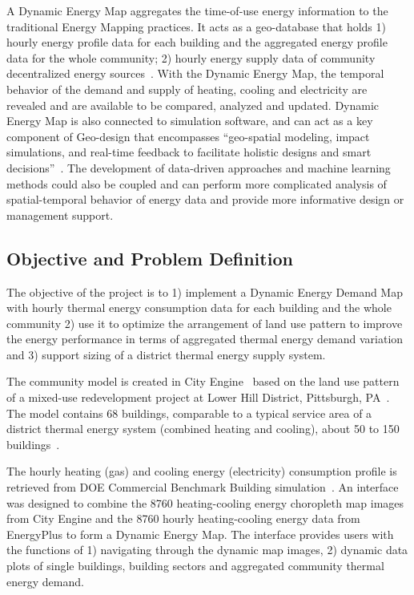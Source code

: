 \documentclass[hidelinks,12pt]{article}
\begin{document}
A Dynamic Energy Map aggregates the time-of-use energy information to
the traditional Energy Mapping practices. It acts as a geo-database
that holds 1) hourly energy profile data for each building and the
aggregated energy profile data for the whole community; 2) hourly
energy supply data of community decentralized energy
sources~\cite{baird2014}. With the Dynamic Energy Map, the temporal
behavior of the demand and supply of heating, cooling and electricity
are revealed and are available to be compared, analyzed and
updated. Dynamic Energy Map is also connected to simulation software,
and can act as a key component of Geo-design that encompasses
``geo-spatial modeling, impact simulations, and real-time feedback to
facilitate holistic designs and smart
decisions''~\cite{esriGeodesign2012}. The development of data-driven
approaches and machine learning methods could also be coupled and can
perform more complicated analysis of spatial-temporal behavior of
energy data and provide more informative design or management support.

\subsection{Objective and Problem Definition}
The objective of the project is to 1) implement a Dynamic Energy
Demand Map with hourly thermal energy consumption data for each
building and the whole community 2) use it to optimize the arrangement
of land use pattern to improve the energy performance in terms of
aggregated thermal energy demand variation and 3) support sizing of a
district thermal energy supply system.

The community model is created in City Engine~\cite{cityEngine2015}
based on the land use pattern of a mixed-use redevelopment project at
Lower Hill District, Pittsburgh, PA~\cite{Ramesh2013}. The model
contains 68 buildings, comparable to a typical service area of a
district thermal energy system (combined heating and cooling), about
50 to 150 buildings~\cite{IDEA2005}.

The hourly heating (gas) and cooling energy (electricity) consumption
profile is retrieved from DOE Commercial Benchmark Building
simulation~\cite{DOE2015}. An interface was designed to combine the
8760 heating-cooling energy choropleth map images from City Engine and
the 8760 hourly heating-cooling energy data from EnergyPlus to form a
Dynamic Energy Map. The interface provides users with the functions of
1) navigating through the dynamic map images, 2) dynamic data
plots of single buildings, building sectors and aggregated community
thermal energy demand.
\end{document}
